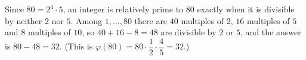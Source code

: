 Since $80=2^4\cdot5$, an integer is relatively prime to $80$ exactly when it is divisible by neither $2$ nor $5$. Among $1,\dots,80$ there are $40$ multiples of $2$, $16$ multiples of $5$ and $8$ multiples of $10$, so $40+16-8=48$ are divisible by $2$ or $5$, and the answer is $80-48=\boxed{32}$. (This is $\varphi(80)=80\cdot\dfrac{1}{2}\cdot\dfrac{4}{5}=32$.)
